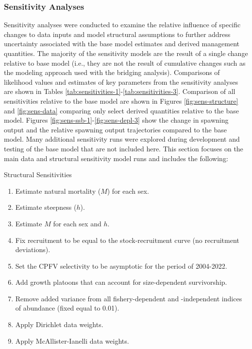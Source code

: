 \documentclass[11pt,
  english,
  letterpaper,
]{article}
\begin{document}
\hypertarget{sensitivities}{%
\subsubsection{Sensitivity Analyses}\label{sensitivities}}

Sensitivity analyses were conducted to examine the relative influence of specific changes to data inputs and model structural assumptions to further address uncertainty associated with the base model estimates and derived management quantities. The majority of the sensitivity models are the result of a single change relative to base model (i.e., they are not the result of cumulative changes such as the modeling approach used with the bridging analysis). Comparisons of likelihood values and estimates of key parameters from the sensitivity analyses are shown in Tables \ref{tab:sensitivities-1}-\ref{tab:sensitivities-3}. Comparison of all sensitivities relative to the base model are shown in Figures \ref{fig:sens-structure} and \ref{fig:sens-data} comparing only select derived quantities relative to the base model. Figures \ref{fig:sens-ssb-1}-\ref{fig:sens-depl-3} show the change in spawning output and the relative spawning output trajectories compared to the base model. Many additional sensitivity runs were explored during development and testing of the base model that are not included here. This section focuses on the main data and structural sensitivity model runs and includes the following:

Structural Sensitivities

\begin{enumerate}
   
  \item  Estimate natural mortality ($M$) for each sex.
  
  \item Estimate steepness ($h$).
  
  \item Estimate $M$ for each sex and $h$.
  
  \item Fix recruitment to be equal to the stock-recruitment curve (no recruitment deviations).
  
  \item Set the CPFV selectivity to be asymptotic for the period of 2004-2022.
  
  \item Add growth platoons that can account for size-dependent survivorship.
  
  \item Remove added variance from all fishery-dependent and -independent indices of abundance (fixed equal to 0.01).
  
  \item Apply Dirichlet data weights.
  
  \item Apply McAllister-Ianelli data weights.

\end{enumerate}
\end{document}
